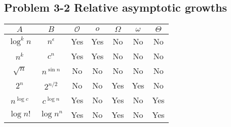 \subsection*{Problem 3-2 Relative asymptotic growths}

\begin{lrbox}{\tablebox}
	\begin{tabular}{c  c | c | c | c | c | c |}
		$A$ & $B$ & $\mathcal{O}$ & $o$ & $\Omega$ & $\omega$ & $\Theta$ \\\hline
		$\log^k{n}$ & $n^{\epsilon}$ & Yes & Yes & No & No & No \\\hline
		$n^k$ & $c^n$ & Yes & Yes & No & No & No \\\hline
		$\sqrt{n}$ & $n^{\sin{n}}$ & No & No & No & No & No \\\hline
		$2^n$ & $2^{n/2}$ & No & No & Yes & Yes & No \\\hline
		$n^{\log{c}}$ & $c^{\log{n}}$ & Yes & No & Yes & No & Yes \\\hline
		$\log{n!}$ & $\log{n^n}$ & Yes & No & Yes & No & Yes \\\hline
	\end{tabular}
\end{lrbox}

\begin{center}
\resizebox{0.7\textwidth}{!}{\usebox{\tablebox}}
\end{center}


